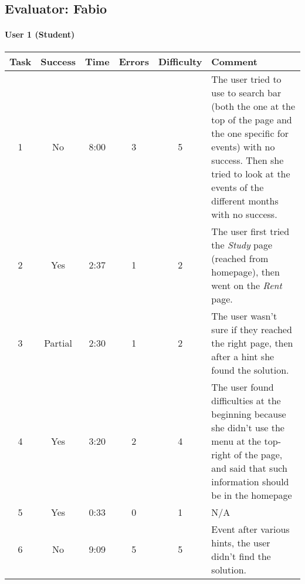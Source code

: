 \begin{small}
\pagebreak

\subsection{Evaluator: Fabio}

\paragraph{User 1 (Student)}
\begin{tabularx}{\linewidth}{c c c c c X}
    \toprule
    \textbf{Task} & \textbf{Success} & \textbf{Time}
     & \textbf{Errors} & \textbf{Difficulty} & \textbf{Comment} \\
    \midrule
    1 & No & 8:00 & 3 & 5 & The user tried to use to search bar (both the one at the top of the page and the one specific for events) with no success. Then she tried to look at the events of the different months with no success. \\ \midrule
    2 & Yes & 2:37 & 1 & 2 & The user first tried the \emph{Study} page (reached from homepage), then went on the \emph{Rent} page. \\ \midrule
    3 & Partial & 2:30 & 1 & 2 & The user wasn't sure if they reached the right page, then after a hint she found the solution. \\ \midrule
    4 & Yes & 3:20 & 2 & 4 & The user found difficulties at the beginning because she didn't use the menu at the top-right of the page, and said that such information should be in the homepage \\ \midrule
    5 & Yes & 0:33 & 0 & 1 & N/A \\ \midrule
    6 & No & 9:09 & 5 & 5 & Event after various hints, the user didn't find the solution. \\ \bottomrule
\end{tabularx}


\end{small}
